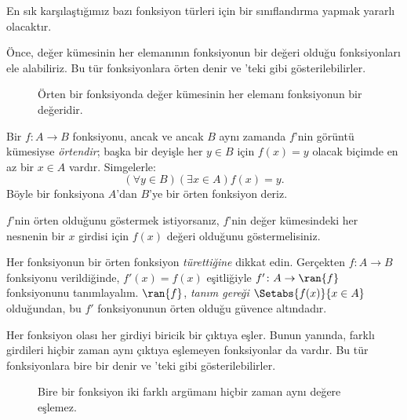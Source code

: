 


\begin{explain}
En sık karşılaştığımız bazı fonksiyon türleri için bir sınıflandırma yapmak
yararlı olacaktır.

Önce, değer kümesinin her elemanının fonksiyonun bir değeri olduğu
fonksiyonları ele alabiliriz. Bu tür fonksiyonlara örten denir ve
'teki gibi gösterilebilirler.

\begin{figure}
  \caption{Örten bir fonksiyonda değer kümesinin her elemanı fonksiyonun bir
    değeridir.}
\end{figure}
\end{explain}

\begin{defn}
Bir $f \colon A \rightarrow B$ fonksiyonu, ancak ve ancak $B$ aynı zamanda
$f$'nin görüntü kümesiyse \emph{örtendir}; başka bir deyişle her $y \in B$
için $f(x)=y$ olacak biçimde en az bir $x \in A$ vardır. Simgelerle:
\[
  (\forall y \in B)(\exists x \in A)f(x) = y.
\]
Böyle bir fonksiyona $A$'dan $B$'ye bir örten fonksiyon deriz.
\end{defn}

\begin{explain}
$f$'nin örten olduğunu göstermek istiyorsanız, $f$'nin değer kümesindeki her
nesnenin bir $x$ girdisi için $f(x)$ değeri olduğunu göstermelisiniz.

Her fonksiyonun bir örten fonksiyon \emph{türettiğine} dikkat edin. Gerçekten
$f \colon A \to B$ fonksiyonu verildiğinde, $f'(x)=f(x)$ eşitliğiyle
$f' \colon A \to \ran{f}$ fonksiyonunu tanımlayalım. $\ran{f}$,
\emph{tanım gereği} $\Setabs{f(x)}{x \in A}$ olduğundan, bu $f'$
fonksiyonunun örten olduğu güvence altındadır.
\end{explain}

\begin{explain}
Her fonksiyon olası her girdiyi biricik bir çıktıya eşler. Bunun yanında,
farklı girdileri hiçbir zaman aynı çıktıya eşlemeyen fonksiyonlar da vardır.
Bu tür fonksiyonlara bire bir denir ve
'teki gibi gösterilebilirler.
\begin{figure}
  \caption{Bire bir fonksiyon iki farklı argümanı hiçbir zaman aynı
    değere eşlemez.}
\end{figure}
\end{explain}

